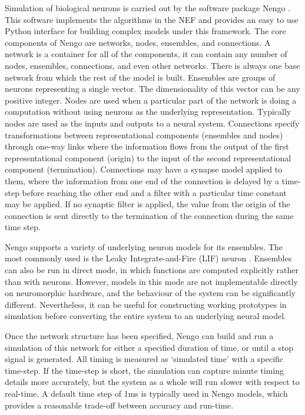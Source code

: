 \documentclass[letterpaper, 10 pt, conference]{ieeeconf}  %
\begin{document}
Simulation of biological neurons is carried out by the software package Nengo \cite{bekolay2013nengo}.
This software implements the algorithms in the NEF and provides an easy to use Python interface for building complex models under this framework.
The core components of Nengo are networks, nodes, ensembles, and connections.
A network is a container for all of the components, it can contain any number of nodes, ensembles, connections, and even other networks.
There is always one base network from which the rest of the model is built.
Ensembles are groups of neurons representing a single vector. 
The dimensionality of this vector can be any positive integer.
Nodes are used when a particular part of the network is doing a computation without using neurons as the underlying representation.
Typically nodes are used as the inputs and outputs to a neural system.
Connections specify transformations between representational components (ensembles and nodes) through one-way links where the information flows from the output of the first representational component (origin) to the input of the second representational component (termination).
Connections may have a synapse model applied to them, where the information from one end of the connection is delayed by a time-step before reaching the other end and a filter with a particular time constant may be applied.
If no synaptic filter is applied, the value from the origin of the connection is sent directly to the termination of the connection during the same time step.

Nengo supports a variety of underlying neuron models for its ensembles.
The most commonly used is the Leaky Integrate-and-Fire (LIF) neuron \cite{burkitt2006review}.
Ensembles can also be run in direct mode, in which functions are computed explicitly rather than with neurons.
However, models in this mode are not implementable directly on neuromorphic hardware, and the behaviour of the system can be significantly different.
Nevertheless, it can be useful for constructing working prototypes in simulation before converting the entire system to an underlying neural model. %

Once the network structure has been specified, Nengo can build and run a simulation of this network for either a specified duration of time, or until a stop signal is generated. 
All timing is measured as `simulated time' with a specific time-step. 
If the time-step is short, the simulation can capture minute timing details more accurately, but the system as a whole will run slower with respect to real-time. A default time step of 1ms is typically used in Nengo models, which provides a reasonable trade-off between accuracy and run-time.
\end{document}
